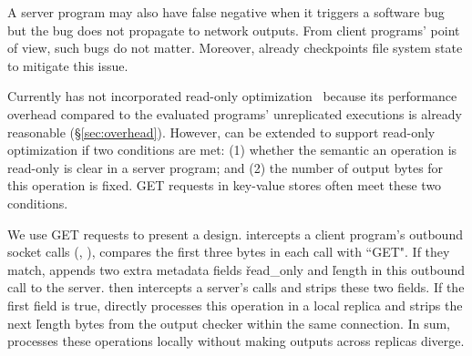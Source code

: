 A server program may also have false negative when it triggers a software bug 
but the bug does not propagate to network outputs. From client programs' point 
of view, such bugs do not matter. Moreover, \xxx already checkpoints file 
system state to mitigate this issue.

Currently \xxx has not incorporated read-only optimization~\cite{eve:osdi12} 
because its performance overhead compared to the evaluated programs' 
unreplicated executions is already reasonable (\S\ref{sec:overhead}). However, 
\xxx can be extended to support read-only optimization if two conditions are 
met: (1) whether the semantic an operation is read-only is clear in a server 
program; and (2) the number of output bytes for this operation is fixed. GET 
requests in key-value stores often meet these two conditions.

We use GET requests to present a design. \xxx intercepts a client program's 
outbound socket calls (\eg, \send), compares the first three bytes in each call 
with ``GET". If they match, \xxx appends two extra \xxx metadata fields 
\v{read\_only} and \v{length} in this outbound call to the server. \xxx then 
intercepts a server's \recv calls and strips these two fields. If the first 
field is true, \xxx directly processes this operation in a local replica 
and strips the next \v{length} bytes from the output checker within the same
connection. In sum, \xxx processes these operations locally without making 
outputs across replicas diverge.





